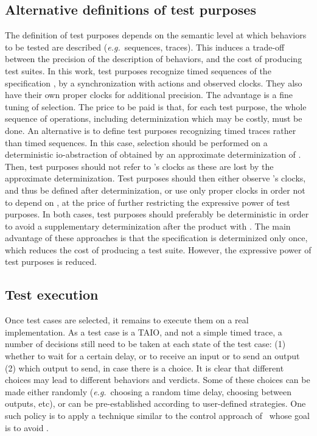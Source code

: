 \documentclass{LMCS}
\theoremstyle{plain}\newtheorem{proposition}[thm]{Proposition}
\def\eg{{\em e.g.}}
\begin{document}
\subsection*{Alternative definitions of test purposes}
The definition of test purposes depends on the semantic level at which
behaviors to be tested are described (\eg~sequences, traces).  This
induces a trade-off between the precision of the description of
behaviors, and the cost of producing test suites.  In this work, test
purposes recognize timed sequences of the specification , by a
synchronization with actions and observed clocks.  They also have
their own proper clocks for additional precision.  The advantage is a
fine tuning of selection.  The price to be paid is that, for each test
purpose, the whole sequence of operations, including determinization
which may be costly, must be done.  An alternative is to define test
purposes recognizing timed traces rather than timed sequences.  In
this case, selection should be performed on a deterministic io-abstraction  of
 obtained by an approximate determinization of .  
Then, test purposes should not refer to 's clocks as these
are lost by the approximate determinization.  Test purposes should
then either observe 's clocks, and thus be defined after
determinization, or use only proper clocks in order not to depend on
, at the price of further restricting the expressive power of test
purposes.  In both cases, test purposes should preferably be
deterministic in order to avoid a supplementary determinization after
the product with .  The main advantage of these approaches is that
the specification is determinized only once, which reduces the cost of
producing a test suite.  However, the expressive power of test
purposes is reduced.



\subsection*{Test execution}
Once test cases are selected, it remains to execute them on a real
implementation.  As a test case is a TAIO, and not a simple timed
trace, a number of decisions still need to be taken at each state of
the test case: (1) whether to wait for a certain delay, or to receive
an input or to send an output (2) which output to send, in case there
is a choice.  It is clear that different choices may lead to different
behaviors and verdicts.  Some of these choices can be made either
randomly (\eg~choosing a random time delay, choosing between outputs,
etc), or can be pre-established according to user-defined strategies.
One such policy is to apply a technique similar to the control
approach of~\cite{DavidLarsenLiNielsen-ICST09} whose goal is to avoid
.
\end{document}
